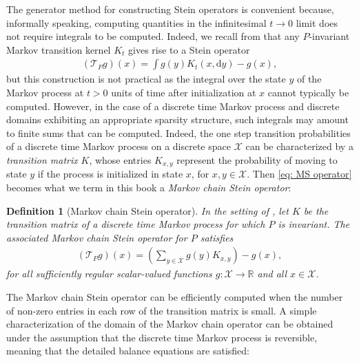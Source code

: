 \documentclass[12pt,paper=letter]{scrreprt}
\newtheorem{definition}{Definition}[chapter]
\def\reals{\mathbb{R}} %
\newcommand{\xset}[0]{\mathcal{X}} %
\newcommand{\TP}{\mathcal{T}_P}
\begin{document}
The generator method for constructing Stein operators is convenient because, informally speaking, computing quantities in the infinitesimal $t \rightarrow 0$ limit does not require integrals to be computed.
Indeed, we recall from  that any $P$-invariant Markov transition kernel $K_t$ gives rise to a Stein operator
\begin{align}
    (\TP g)(x) = \int g(y) K_t(x, \mathrm{d}y) - g(x) , \label{eq: MS operator}
\end{align}
but this construction is not practical as the integral over the state $y$ of the Markov process at $t > 0$ units of time after initialization at $x$ cannot typically be computed.
However, in the case of a discrete time Markov process and discrete domains exhibiting an appropriate sparsity structure, such integrals may amount to finite sums that can be computed.
Indeed, the one step transition probabilities of a discrete time Markov process on a discrete space $\xset$ can be characterized by a \emph{transition matrix} $K$, whose entries $K_{x,y}$ represent the probability of moving to state $y$ if the process is initialized in state $x$, for $x,y \in \xset$.
Then \cref{eq: MS operator} becomes what we term in this book a \emph{Markov chain Stein operator}:

\begin{definition}[Markov chain Stein operator]
In the setting of , let $K$ be the transition matrix of a discrete time Markov process for which $P$ is invariant.
The associated \emph{Markov chain Stein operator} for $P$ satisfies
    \begin{align*}
    (\TP g)(x) = \left( \sum_{y \in \xset} g(y) K_{x,y} \right) - g(x) ,
\end{align*}    
for all sufficiently regular scalar-valued functions $g : \xset \rightarrow \reals$ and all $x \in \xset$.
\end{definition}

The Markov chain Stein operator can be efficiently computed when the number of non-zero entries in each row of the transition matrix is small.
A simple characterization of the domain of the Markov chain operator can be obtained under the assumption that the discrete time Markov process is reversible, meaning that the detailed balance equations are satisfied:
\end{document}
